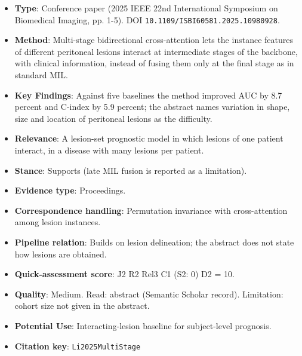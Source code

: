 \documentclass[journal,onecolumn]{IEEEtran}
\begin{document}
\begin{itemize}

\item{} \textbf{Type}: Conference paper (2025 IEEE 22nd International Symposium on Biomedical Imaging, pp. 1-5). DOI \nolinkurl{10.1109/ISBI60581.2025.10980928}.

\item{} \textbf{Method}: Multi-stage bidirectional cross-attention lets the instance features of different peritoneal lesions interact at intermediate stages of the backbone, with clinical information, instead of fusing them only at the final stage as in standard MIL.

\item{} \textbf{Key Findings}: Against five baselines the method improved AUC by 8.7 percent and C-index by 5.9 percent; the abstract names variation in shape, size and location of peritoneal lesions as the difficulty.

\item{} \textbf{Relevance}: A lesion-set prognostic model in which lesions of one patient interact, in a disease with many lesions per patient.

\item{} \textbf{Stance}: Supports (late MIL fusion is reported as a limitation).

\item{} \textbf{Evidence type}: Proceedings.

\item{} \textbf{Correspondence handling}: Permutation invariance with cross-attention among lesion instances.

\item{} \textbf{Pipeline relation}: Builds on lesion delineation; the abstract does not state how lesions are obtained.

\item{} \textbf{Quick-assessment score}: J2 R2 Rel3 C1 (S2: 0) D2 = 10.

\item{} \textbf{Quality}: Medium. Read: abstract (Semantic Scholar record). Limitation: cohort size not given in the abstract.

\item{} \textbf{Potential Use}: Interacting-lesion baseline for subject-level prognosis.

\item{} \textbf{Citation key}: \texttt{Li2025MultiStage}

\end{itemize}
\end{document}

